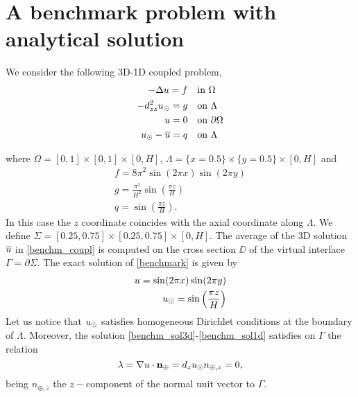 \section{A benchmark problem with analytical solution}

We consider the following 3D-1D coupled problem,
\begin{subequations}\label{benchmark}
\begin{align}
\label{benchm_3d}
-\Delta u=f \quad &\text{in $\Omega$}\\
\label{benchm_1d}
-d_{zz}^2 \ud =g \quad &\text{on $\Lambda$}\\
u=0 \quad &\text{on $\partial \Omega$}\\
\label{benchm_coupl}
\ud -\avrc{u}=q \quad &\text{on $\Lambda$}
\end{align}
\end{subequations}

where $\Omega=[0,1]\times [0,1]\times [0,H]$, $\Lambda=\{x=0.5\}\times \{y=0.5\} \times [0,H] $ and
\begin{eqnarray*}
f=8\pi ^2 \sin (2\pi x) \sin (2\pi y)\\
g=\frac{\pi ^2}{H^2} \sin \left(\frac{\pi z}{H}\right)\\
q=\sin \left(\frac{\pi z}{H}\right).
\end{eqnarray*}
In this case the $z$ coordinate coincides with the axial coordinate along $\Lambda$. We define $\Sigma=[0.25,0.75]\times [0.25,0.75]\times [0,H]$. The average of the 3D solution $\overline{u}$ in \eqref{benchm_coupl} is computed on the cross section $\DD$ of the virtual interface $\Gamma=\partial \Sigma$. The exact solution of \eqref{benchmark} is given by
\begin{eqnarray}
\label{benchm_sol3d}
u=\sin (2\pi x) \sin (2\pi y)\\
\label{benchm_sol1d}
\ud=\sin \left(\frac{\pi z}{H}\right) 
\end{eqnarray}
Let us notice that $u_{\odot}$ satisfies homogeneous Dirichlet conditions at the boundary of $\Lambda$.
Moreover, the solution \eqref{benchm_sol3d}-\eqref{benchm_sol1d} satisfies on $\Gamma$ the relation
\begin{equation}\label{benchm_flux}
\lambda=\nabla u \cdot \textbf{n}_{\oplus}=d_z \ud n_{\oplus,z}=0,
\end{equation}
being $n_{\oplus,z}$ the $z-$component of the normal unit vector to $\Gamma$.

